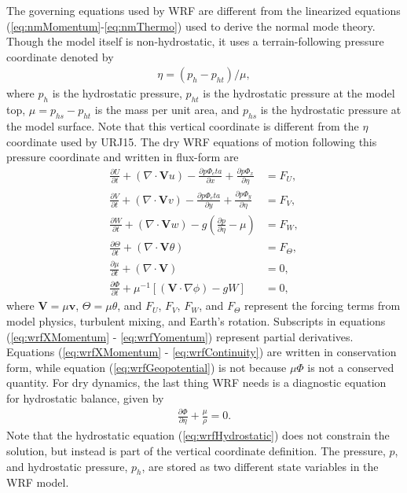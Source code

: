  The governing equations used by WRF are different from the linearized equations (\ref{eq:nmMomentum}-\ref{eq:nmThermo}) used to derive the normal mode theory. Though the model itself is non-hydrostatic, it uses a terrain-following pressure coordinate denoted by
\begin{align}
\eta = (p_h - p_{ht})/\mu \label{eq:wrfVert},
\end{align}
where $p_h$ is the hydrostatic pressure, $p_{ht}$ is the hydrostatic pressure at the model top, $\mu = p_{hs} - p_{ht}$ is the mass per unit area, and $p_{hs}$ is the hydrostatic pressure at the model surface. Note that this vertical coordinate is different from the $\eta$ coordinate used by URJ15. The dry WRF equations of motion following this pressure coordinate and written in flux-form are
\begin{align}
\frac{\partial U}{\partial t} + (\nabla \cdot \mathbf{V}u) - \frac{\partial p\Phi_eta}{\partial x} + \frac{\partial p\Phi_x}{\partial \eta} &= F_U,\label{eq:wrfXMomentum}\\
\frac{\partial V}{\partial t} + (\nabla \cdot \mathbf{V}v) - \frac{\partial p\Phi_eta}{\partial y} + \frac{\partial p\Phi_y}{\partial \eta} &= F_V, \label{eq:wrfYomentum}\\
\frac{\partial W}{\partial t} + (\nabla \cdot \mathbf{V}w) - g\left(\frac{\partial p}{\partial \eta} - \mu\right)& = F_W, \label{eq:wrfPMomentum}\\
\frac{\partial \Theta} {\partial t} + (\nabla \cdot \mathbf{V}\theta) &= F_\Theta, \label{eq:wrfThermo}\\
\frac{\partial \mu}{\partial t} + (\nabla \cdot \mathbf{V}) &= 0, \label{eq:wrfContinuity}\\
\frac{\partial \Phi}{\partial t} + \mu^{-1}\left[(\mathbf{V} \cdot \nabla \phi) - gW\right] &= 0, \label{eq:wrfGeopotential}
\end{align}
where $\mathbf{V} = \mu\mathbf{v}$, $\Theta = \mu\theta$, and $F_U$, $F_V$, $F_W$, and $F_\Theta$ represent the forcing terms from model physics, turbulent mixing, and Earth's rotation. Subscripts in equations (\ref{eq:wrfXMomentum} - \ref{eq:wrfYomentum}) represent partial derivatives. Equations (\ref{eq:wrfXMomentum} - \ref{eq:wrfContinuity}) are written in conservation form, while equation (\ref{eq:wrfGeopotential}) is not because $\mu\Phi$ is not a conserved quantity. For dry dynamics, the last thing WRF needs is a diagnostic equation for hydrostatic balance, given by
\begin{align}
\frac{\partial \Phi}{\partial \eta} + \frac{\mu}{\rho} = 0. \label{eq:wrfHydrostatic}
\end{align}
Note that the hydrostatic equation (\ref{eq:wrfHydrostatic}) does not constrain the solution, but instead is part of the vertical coordinate definition. The pressure, $p$, and hydrostatic pressure, $p_h$, are stored as two different state variables in the WRF model.\\

